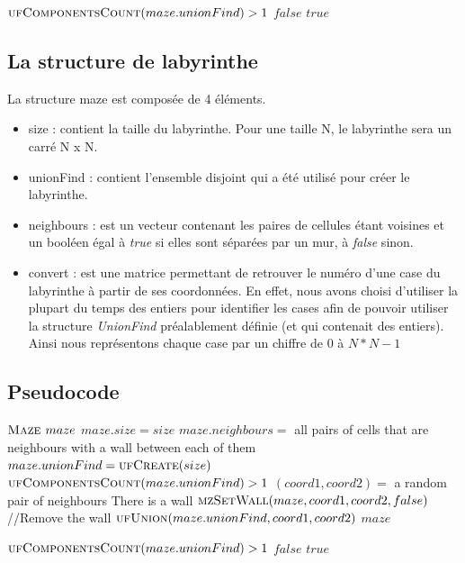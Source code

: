 \begin{codebox}
\li \If $\textnormal{\scshape ufComponentsCount}(maze.unionFind) > 1$
\li \Then \Return $false$
\li \Else
\li \Return $true$
\End
\End
\end{codebox}

\subsection{La structure de labyrinthe} %
La structure maze est composée de 4 éléments.
\begin{itemize}
\item size : contient la taille du labyrinthe. Pour une taille N, le labyrinthe sera un carré N x N.
\item unionFind : contient l'ensemble disjoint qui a été utilisé pour créer le labyrinthe.
\item neighbours : est un vecteur contenant les paires de cellules étant voisines et un booléen égal à \textit{true} si elles sont séparées par un mur, à \textit{false} sinon.
\item convert : est une matrice permettant de retrouver le numéro d'une case du labyrinthe à partir de ses coordonnées.
\bigbreak
En effet, nous avons choisi d'utiliser la plupart du temps des entiers pour identifier les cases afin de pouvoir utiliser la structure \textit{UnionFind} préalablement définie (et qui contenait des entiers). Ainsi nous représentons chaque case par un chiffre de $0$ à $N *N - 1$
\end{itemize}

\subsection{Pseudocode} %
\begin{codebox}
\li $\textnormal{\scshape Maze } maze$
\li $maze.size = size$
\li $maze.neighbours =$ all pairs of cells that are neighbours with a wall between each of them
\li $maze.unionFind = \textnormal{\scshape ufCreate}(size)$
\li \While $\textnormal{\scshape ufComponentsCount}(maze.unionFind) > 1$
\Do
\li 	$(coord1, coord2) =$ a random pair of neighbours
\li		\If There is a wall
\li \Then $\textnormal{\scshape mzSetWall}(maze, coord1, coord2, false)$ //Remove the wall
\li	$\textnormal{\scshape ufUnion}(maze.unionFind, coord1, coord2)$
\End
\End
\li \Return $maze$
\End
\end{codebox}

\begin{codebox}
\li \If $\textnormal{\scshape ufComponentsCount}(maze.unionFind) > 1$
\li \Then \Return $false$
\li \Else
\li \Return $true$
\End
\End
\end{codebox}

